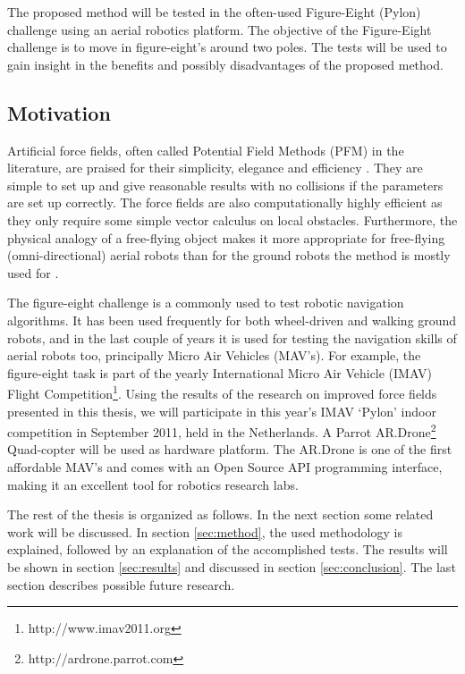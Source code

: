 \documentclass[11pt]{article}
\begin{document}
The proposed method will be tested in the often-used Figure-Eight (Pylon) challenge using an aerial robotics platform. The objective of the Figure-Eight challenge is to move in figure-eight's around two poles. The tests will be used to gain insight in the benefits and possibly disadvantages of the proposed method.



\subsection{Motivation}
\label{sec:motivation}


Artificial force fields, often called Potential Field Methods (PFM) in the literature, are praised for their simplicity, elegance and efficiency \cite{koren91}. They are simple to set up and give reasonable results with no collisions if the parameters are set up correctly. The force fields are also computationally highly efficient as they only require some simple vector calculus on local obstacles. Furthermore, the physical analogy of a free-flying object makes it more appropriate for free-flying (omni-directional) aerial robots than for the ground robots the method is mostly used for \cite{burgard99}. %

The figure-eight challenge is a commonly used to test robotic navigation algorithms. %
It has been used frequently for both wheel-driven and walking ground robots, and in the last couple of years it is used for testing the navigation skills of aerial robots too, principally Micro Air Vehicles (MAV's). For example, the figure-eight task is part of the yearly International Micro Air Vehicle (IMAV) Flight Competition\footnote{http://www.imav2011.org}. Using the results of the research on improved force fields presented in this thesis, we will participate in this year's IMAV `Pylon' indoor competition in September 2011, held in the Netherlands. A Parrot AR.Drone\footnote{http://ardrone.parrot.com} Quad-copter will be used as hardware platform. The AR.Drone is one of the first affordable MAV's and comes with an Open Source API programming interface, making it an excellent tool for robotics research labs.

The rest of the thesis is organized as follows. In the next section some related work will be discussed. In section \ref{sec:method}, the used methodology is explained, followed by an explanation of the accomplished tests. The results will be shown in section \ref{sec:results} and discussed in section \ref{sec:conclusion}. The last section describes possible future research.
\end{document}
